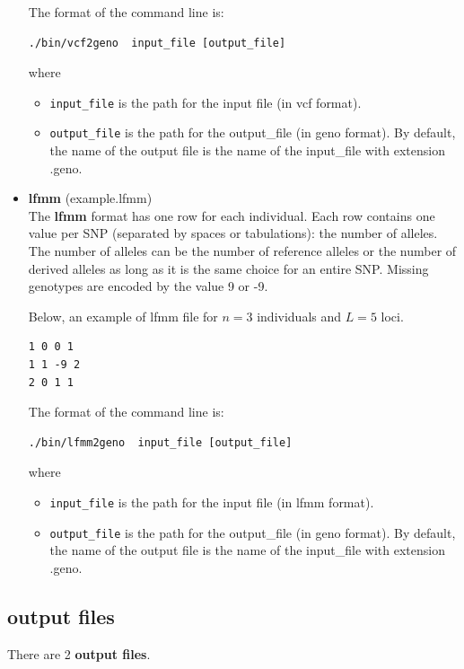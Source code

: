 \documentclass[10pt,a4paper]{article}
\begin{document}
\begin{itemize}
The format of the command line is:
\begin{Verbatim}[frame=single]
./bin/vcf2geno  input_file [output_file]
\end{Verbatim}
where 
\begin{itemize}
\item \verb|input_file| is the path for the input file (in vcf format).
\item \verb|output_file| is the path for the output\_file (in geno format). 
By default, the name of the output file is the name of the input\_file with extension .geno.
\end{itemize}

\item {\bf lfmm} (example.lfmm)\\
The {\bf lfmm} format has one row for each individual. Each row contains one value per SNP (separated by spaces or tabulations): the number of alleles. The number of alleles can be the number of reference alleles or the number of derived alleles as long as it is the same choice for an entire SNP. Missing genotypes are encoded by the value 9 or -9. 


Below, an example of lfmm file for $n=3$ individuals and $L=5$ loci.
\begin{center}
\footnotesize
\begin{Verbatim}[frame=single]
1 0 0 1
1 1 -9 2
2 0 1 1
\end{Verbatim}
\end{center}

The format of the command line is:
\begin{Verbatim}[frame=single]
./bin/lfmm2geno  input_file [output_file]
\end{Verbatim}
where 
\begin{itemize}
\item \verb|input_file| is the path for the input file (in lfmm format).
\item \verb|output_file| is the path for the output\_file (in geno format). 
By default, the name of the output file is the name of the input\_file with extension .geno.
\end{itemize}

\end{itemize}




\subsection{output files}
\noindent
There are 2 {\bf output files}.
\end{document}
